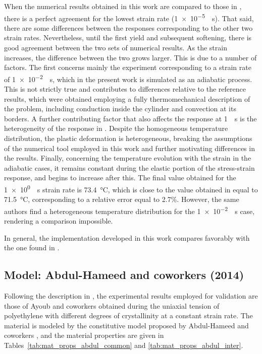 When the numerical results obtained in this work are compared to those in \cite{haoUnifiedAmorphousCrystalline2022}, there is a perfect agreement for the lowest strain rate (\SI{1e-5}{\per\second}).
That said, there are some differences between the responses corresponding to the other two strain rates.
Nevertheless, until the first yield and subsequent softening, there is good agreement between the two sets of numerical results.
As the strain increases, the difference between the two grows larger.
This is due to a number of factors.
The first concerns mainly the experiment corresponding to a strain rate of \SI{1e-2}{\per\second}, which in the present work is simulated as an adiabatic process.
This is not strictly true and contributes to differences relative to the reference results, which were obtained employing a fully thermomechanical description of the problem, including conduction inside the cylinder and convection at its borders.
A further contributing factor that also affects the response at \SI{1}{\per\second} is the heterogeneity of the response in \cite{haoUnifiedAmorphousCrystalline2022}.
Despite the homogeneous temperature distribution, the plastic deformation is heterogeneous, breaking the assumptions of the numerical tool employed in this work and further motivating differences in the results.
Finally, concerning the temperature evolution with the strain in the adiabatic cases, it remains constant during the elastic portion of the stress-strain response, and begins to increase after this.
The final value obtained for the \SI{1e0}{\per\second} strain rate is \SI{73.4}{\celsius}, which is close to the value obtained in \cite{haoUnifiedAmorphousCrystalline2022} equal to \SI{71.5}{\celsius}, corresponding to a relative error equal to 2.7\%.
However, the same authors find a heterogeneous temperature distribution for the \SI{1e-2}{\per\second} case, rendering a comparison impossible.

In general, the implementation developed in this work compares favorably with the one found in \cite{haoUnifiedAmorphousCrystalline2022}.

\subsection{Model: Abdul-Hameed and coworkers (2014)}

Following the description in \cite{abdul-hameedTwophaseHyperelasticviscoplasticConstitutive2014}, the experimental results employed for validation are those of Ayoub and coworkers \citep{ayoubEffectsCrystalContent2011} obtained during the uniaxial tension of polyethylene with different degrees of crystallinity at a constant strain rate.
The material is modeled by the constitutive model proposed by Abdul-Hameed and coworkers \citep{abdul-hameedTwophaseHyperelasticviscoplasticConstitutive2014}, and the material properties are given in Tables~\ref{tab:mat_props_abdul_common} and \ref{tab:mat_props_abdul_inter}.
%

